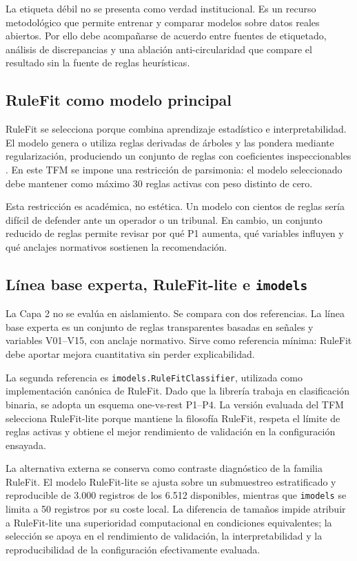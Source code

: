 La etiqueta débil no se presenta como verdad institucional. Es un recurso metodológico que permite entrenar y comparar modelos sobre datos reales abiertos. Por ello debe acompañarse de acuerdo entre fuentes de etiquetado, análisis de discrepancias y una ablación anti-circularidad que compare el resultado sin la fuente de reglas heurísticas.

\subsection{RuleFit como modelo principal}

RuleFit se selecciona porque combina aprendizaje estadístico e interpretabilidad. El modelo genera o utiliza reglas derivadas de árboles y las pondera mediante regularización, produciendo un conjunto de reglas con coeficientes inspeccionables \cite{Friedman2008RuleFit}. En este TFM se impone una restricción de parsimonia: el modelo seleccionado debe mantener como máximo 30 reglas activas con peso distinto de cero.

Esta restricción es académica, no estética. Un modelo con cientos de reglas sería difícil de defender ante un operador o un tribunal. En cambio, un conjunto reducido de reglas permite revisar por qué P1 aumenta, qué variables influyen y qué anclajes normativos sostienen la recomendación.

\subsection{Línea base experta, RuleFit-lite e \texttt{imodels}}

La Capa 2 no se evalúa en aislamiento. Se compara con dos referencias. La línea base experta es un conjunto de reglas transparentes basadas en señales y variables V01--V15, con anclaje normativo. Sirve como referencia mínima: RuleFit debe aportar mejora cuantitativa sin perder explicabilidad.

La segunda referencia es \texttt{imodels.RuleFitClassifier}, utilizada como implementación canónica de RuleFit. Dado que la librería trabaja en clasificación binaria, se adopta un esquema one-vs-rest P1--P4. La versión evaluada del TFM selecciona RuleFit-lite porque mantiene la filosofía RuleFit, respeta el límite de reglas activas y obtiene el mejor rendimiento de validación en la configuración ensayada.

La alternativa externa se conserva como contraste diagnóstico de la familia RuleFit. El modelo RuleFit-lite se ajusta sobre un submuestreo estratificado y reproducible de 3.000 registros de los 6.512 disponibles, mientras que \texttt{imodels} se limita a 50 registros por su coste local. La diferencia de tamaños impide atribuir a RuleFit-lite una superioridad computacional en condiciones equivalentes; la selección se apoya en el rendimiento de validación, la interpretabilidad y la reproducibilidad de la configuración efectivamente evaluada.

